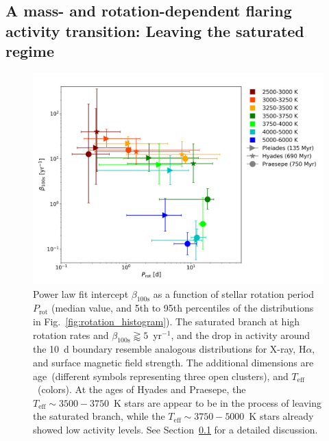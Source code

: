 \documentclass{aa}
\begin{document}
\subsection{A mass- and rotation-dependent flaring activity transition: Leaving the saturated regime}
\label{sec:4dim}
\begin{figure}[ht!]
    \centering
    \includegraphics[width=\hsize]{pics/FFDs/beta_T_age_rotation_full.png}
    \caption{Power law fit intercept $\beta_\mathrm{100s}$ as a function of stellar rotation period $P_\mathrm{rot}$ (median value, and 5th to 95th percentiles of the distributions in Fig.~\ref{fig:rotation_histogram}). The saturated branch at high rotation rates and $\beta_\mathrm{100s}\gtrapprox 5$~yr$^{-1}$, and the drop in activity around the 10~d boundary resemble analogous distributions for X-ray, H$\alpha$, and surface magnetic field strength. The additional dimensions are age~(different symbols representing three open clusters), and $T_\mathrm{eff}$~(colors). At the ages of Hyades and Praesepe, the $T_\mathrm{eff}\sim 3500-3750$~K stars are appear to be in the process of leaving the saturated branch, while the $T_\mathrm{eff}\sim 3750-5000$~K stars already showed low activity levels. See Section~\ref{sec:4dim} for a detailed discussion.}       
    \label{fig:4dim}
\end{figure}
\end{document}
